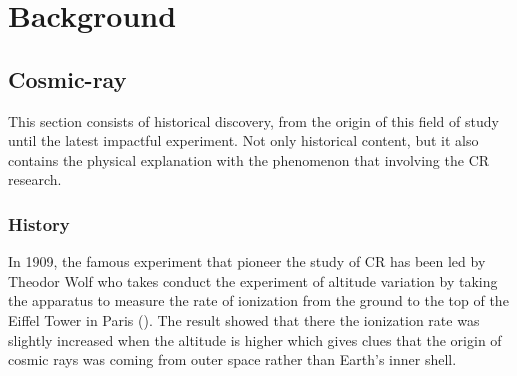 \chapter{Background}


\section{Cosmic-ray}
This section consists of historical discovery, from the origin
of this field of study until the latest impactful experiment.
Not only historical content, but it also contains the physical
explanation with the phenomenon that involving the CR research.

\subsection{History}
In 1909, the famous experiment that pioneer the study of CR has been
led by Theodor Wolf who takes conduct the experiment of 
altitude variation by taking the apparatus to measure 
the rate of ionization from the ground to the top of 
the Eiffel Tower in Paris (\cite{gray1949cosmic}).
The result showed that there the ionization rate was slightly increased when the altitude is higher which gives clues
that the origin of cosmic rays was coming from outer space
rather than Earth's inner shell. \cite{EarlyCRGerman}


